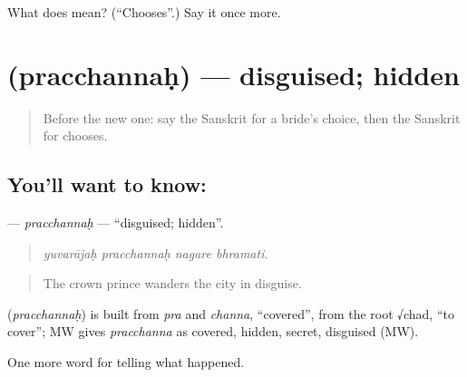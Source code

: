 \begin{tcolorbox}[breakable,colback=teal!4,colframe=teal!35!black,title={Before you move on}]
What does  mean? (\textquotedblleft{}Chooses\textquotedblright{}.) Say it once more.
\end{tcolorbox}
\section[\texorpdfstring{\sk{प्रच्छन्नः} (pracchannaḥ)}{प्रच्छन्नः (pracchannaḥ)}]{ (pracchannaḥ) — disguised; hidden}

\label{lesson:SA-C339-pracchannah}



\begin{quote}
Before the new one: say the Sanskrit for a bride's choice, then the Sanskrit for chooses.
\end{quote}

\subsection*{You'll want to know: }
\textbf{} — \emph{pracchannaḥ} — \textquotedblleft{}disguised; hidden\textquotedblright{}.

\begin{quote}
   
\end{quote}

\begin{quote}
\emph{yuvarājaḥ pracchannaḥ nagare bhramati.}
\end{quote}

\begin{quote}
The crown prince wanders the city in disguise.
\end{quote}

\begin{cousinweb}
\textbf{} (\emph{pracchannaḥ}) is built from \emph{pra} and \emph{channa}, \textquotedblleft{}covered\textquotedblright{}, from the root √chad, \textquotedblleft{}to cover\textquotedblright{}; MW gives \emph{pracchanna} as covered, hidden, secret, disguised (MW).
\end{cousinweb}

\begin{grammarlens}[title={What you've built}]
One more word for telling what happened.
\end{grammarlens}

